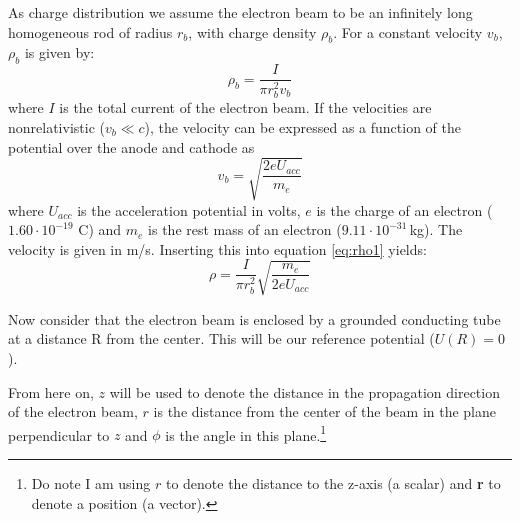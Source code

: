As charge distribution we assume the electron beam to be an infinitely long homogeneous rod of radius $r_b$, with charge density $\rho_b$. For a constant velocity $v_b$, $\rho_b$ is given by:
\begin{equation}
\label{eq:rho1}
\rho_b = \frac{I}{\pi r_b^2v_b}
\end{equation}
where $I$ is the total current of the electron beam.
If the velocities are nonrelativistic ($v_b\ll c$), the velocity can be expressed as a function of the potential over the anode and cathode as
\begin{displaymath}
v_b = \sqrt{\frac{2eU_{acc}}{m_e}}
\end{displaymath}
where $U_{acc}$ is the acceleration potential in volts, $e$ is the charge of an electron ($1.60\cdot10^{-19}$ C) and $m_e$ is the rest mass of an electron ($9.11\cdot 10^{-31}$\,kg). The velocity is given in m/s. Inserting this into equation \ref{eq:rho1} yields:
\begin{equation}
\rho = \frac{I}{\pi r_b^2} \sqrt{\frac{m_e}{2eU_{acc}}}
\end{equation}

Now consider that the electron beam is enclosed by a grounded conducting tube at a distance R from the center. This will be our reference potential ($U(R) = 0$).

From here on, $z$ will be used to denote the distance in the propagation direction of the electron beam, $r$ is the distance from the center of the beam in the plane perpendicular to $z$ and $\phi$ is the angle in this plane.\footnote{Do note I am using $r$ to denote the distance to the z-axis (a scalar) and \textbf{r} to denote a position (a vector).}


